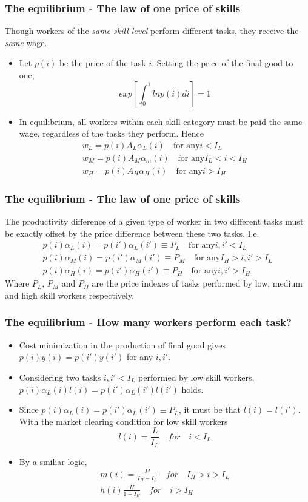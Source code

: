 \documentclass[mathserif]{beamer}
\begin{document}
\begin{frame}
\frametitle{The equilibrium - The law of one price of skills}
Though workers of the \textit{same skill level} perform different tasks, they receive the \textit{same} wage.
\begin{itemize}
\item Let $p(i)$ be the price of the task $i$. Setting the price of the final good to one,
\begin{equation*}
exp[\int_0^1lnp(i)di]=1
\end{equation*}
\item In equilibrium, all workers within each skill category must be paid the same wage, regardless of the tasks they perform. Hence
\begin{multline*}
w_L=p(i)A_L\alpha_L(i) \quad \text{for any} i<I_L
\\ w_M=p(i)A_M\alpha_m(i) \quad \text{for any} I_L<i<I_H
\\ w_H=p(i)A_H\alpha_H(i) \quad \text{for any} i>I_H
\end{multline*}
\end{itemize}
\end{frame}
\begin{frame}
\frametitle{The equilibrium - The law of one price of skills}
The productivity difference of a given type of worker in two different tasks must be exactly offset by the price difference between these two tasks. I.e.
\begin{multline*}
p(i)\alpha_L(i)=p(i')\alpha_L(i')\equiv P_L \quad \text{for any} i,i'<I_L
\\ p(i)\alpha_M(i)=p(i')\alpha_M(i')\equiv P_M \quad \text{for any} I_H>i,i'>I_L
\\ p(i)\alpha_H(i)=p(i')\alpha_H(i')\equiv P_H \quad \text{for any} i,i'>I_H
\end{multline*}
Where $P_L$, $P_M$ and $P_H$ are the price indexes of tasks performed by low, medium and high skill workers respectively.
\end{frame}
\begin{frame}
\frametitle{The equilibrium - How many workers perform each task?}
\begin{itemize}
\item Cost minimization in the production of final good gives $p(i)y(i)=p(i')y(i')$ for any $i,i'$.
\item Considering two tasks $i,i'<I_L$ performed by low skill workers, $p(i)\alpha_L(i)l(i)=p(i')\alpha_L(i')l(i')$ holds.
\item Since $p(i)\alpha_L(i)=p(i')\alpha_L(i')\equiv P_L$, it must be that $l(i)=l(i')$. With the market clearing condition for low skill workers
\begin{equation*}
l(i)=\frac{L}{I_L} \quad for \quad i<I_L
\end{equation*}
\item By a smiliar logic,
\begin{multline*}
m(i)=\frac{M}{I_H-I_L} \quad for \quad I_H>i>I_L
\\ h(i)\frac{H}{1-I_H} \quad for \quad i>I_H
\end{multline*}
\end{itemize}
\end{frame}
\end{document}
